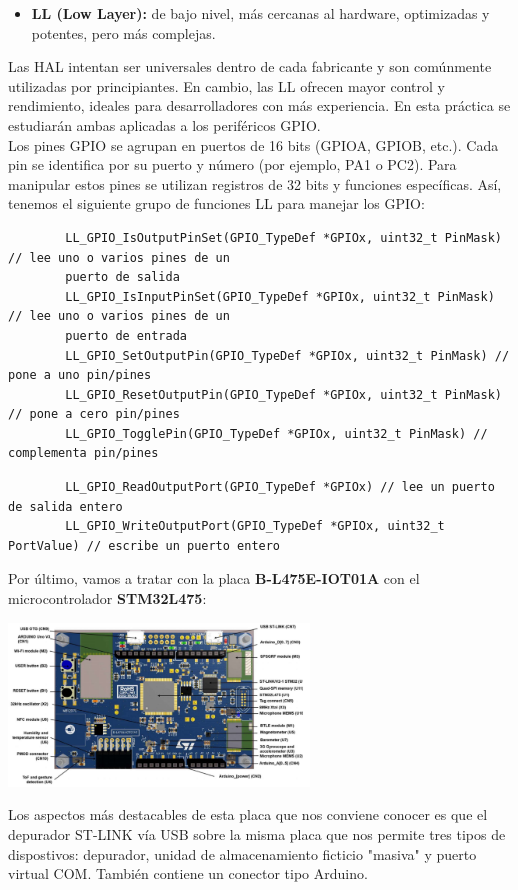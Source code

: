 \documentclass[11pt,a4paper]{article}
\begin{document}
{\begin{itemize}
			\item \textbf{LL (Low Layer):} de bajo nivel, más cercanas al hardware, optimizadas y potentes, pero más complejas.\\
		\end{itemize}
		
		Las HAL intentan ser universales dentro de cada fabricante y son comúnmente utilizadas por principiantes. En cambio, las LL ofrecen mayor control y rendimiento, ideales para desarrolladores con más experiencia. En esta práctica se estudiarán ambas aplicadas a los periféricos GPIO.\\
		
		Los pines GPIO se agrupan en puertos de 16 bits (GPIOA, GPIOB, etc.). Cada pin se identifica por su puerto y número (por ejemplo, PA1 o PC2). Para manipular estos pines se utilizan registros de 32 bits y funciones específicas. Así, tenemos el siguiente grupo de funciones LL para manejar los GPIO:
		\begin{lstlisting}
		LL_GPIO_IsOutputPinSet(GPIO_TypeDef *GPIOx, uint32_t PinMask) // lee uno o varios pines de un
		puerto de salida
		LL_GPIO_IsInputPinSet(GPIO_TypeDef *GPIOx, uint32_t PinMask) // lee uno o varios pines de un
		puerto de entrada
		LL_GPIO_SetOutputPin(GPIO_TypeDef *GPIOx, uint32_t PinMask) // pone a uno pin/pines
		LL_GPIO_ResetOutputPin(GPIO_TypeDef *GPIOx, uint32_t PinMask) // pone a cero pin/pines
		LL_GPIO_TogglePin(GPIO_TypeDef *GPIOx, uint32_t PinMask) // complementa pin/pines
		\end{lstlisting}
		
		\begin{lstlisting}
		LL_GPIO_ReadOutputPort(GPIO_TypeDef *GPIOx) // lee un puerto de salida entero
		LL_GPIO_WriteOutputPort(GPIO_TypeDef *GPIOx, uint32_t PortValue) // escribe un puerto entero
		\end{lstlisting}
		\vspace{1em}
		
		Por último, vamos a tratar con la placa \textbf{B-L475E-IOT01A} con el microcontrolador \textbf{STM32L475}:
		\begin{center}
			\includegraphics[width=0.6\textwidth]{bl475.png}
		\end{center}
		
		Los aspectos más destacables de esta placa que nos conviene conocer es que el depurador ST-LINK vía USB sobre la misma placa que nos permite tres tipos de dispostivos: depurador, unidad de almacenamiento ficticio "masiva" y puerto virtual COM. También contiene un conector tipo Arduino.
	}
	
\end{document}
